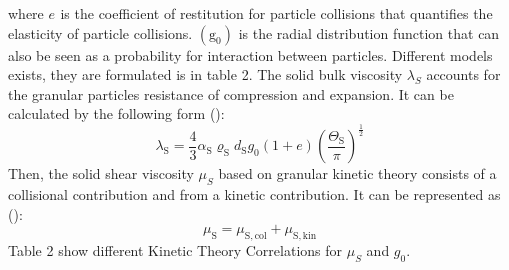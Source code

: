 \documentclass[11pt]{report}
\begin{document}
where \(e_{\mathrm{}}\) is the coefficient of restitution for particle collisions that quantifies the elasticity of particle collisions. 
%
$(\mathrm{g_{0}})$ is the radial distribution function that can also be seen as a probability for interaction between particles. 
%
Different models exists, they are  formulated is in table 2.
%
The solid bulk viscosity $\lambda_S$ accounts for the granular particles resistance of compression and expansion. 
%
It can be calculated by the following form (\citet{Ekambara-2009}):
%
\begin{equation}
\lambda_{\mathrm{S}}=\frac{4}{3} \alpha_{\mathrm{S}} \varrho_{\mathrm{S}} d_{\mathrm{S}} g_{0}\left(1+e\right)\left(\frac{\Theta_{\mathrm{S}}}{\pi}\right)^{\frac{1}{2}}
\end{equation}
Then, the solid shear viscosity $\mu_S$ based on granular kinetic theory consists of a collisional contribution and from a kinetic contribution. It can be represented as (\citet{GID-1994}):
\begin{equation}
\mu_{\mathrm{S}}=\mu_{\mathrm{S}, \mathrm{col}}+\mu_{\mathrm{S}, \mathrm{kin}} 
\end{equation}
%
Table 2 show different Kinetic Theory Correlations for $\mu_S$ and $g_0$.
\end{document}
